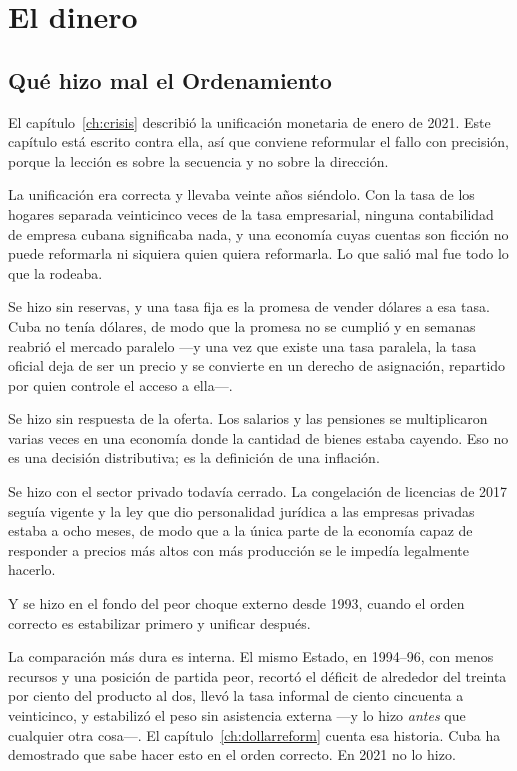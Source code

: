 \chapter{El dinero}
\label{ch:money}

\section{Qué hizo mal el Ordenamiento}

El capítulo~\ref{ch:crisis} describió la unificación monetaria de enero de 2021. Este
capítulo está escrito contra ella, así que conviene reformular el fallo con
precisión, porque la lección es sobre la secuencia y no sobre la dirección.

La unificación era correcta y llevaba veinte años siéndolo. Con la tasa de los hogares
separada veinticinco veces de la tasa empresarial, ninguna contabilidad de empresa
cubana significaba nada, y una economía cuyas cuentas son ficción no puede reformarla
ni siquiera quien quiera reformarla. Lo que salió mal fue todo lo que la rodeaba.

Se hizo sin reservas, y una tasa fija es la promesa de vender dólares a esa tasa. Cuba
no tenía dólares, de modo que la promesa no se cumplió y en semanas reabrió el mercado
paralelo ---y una vez que existe una tasa paralela, la tasa oficial deja de ser un
precio y se convierte en un derecho de asignación, repartido por quien controle el
acceso a ella---.

Se hizo sin respuesta de la oferta. Los salarios y las pensiones se multiplicaron
varias veces en una economía donde la cantidad de bienes estaba cayendo. Eso no es una
decisión distributiva; es la definición de una inflación.

Se hizo con el sector privado todavía cerrado. La congelación de licencias de 2017
seguía vigente y la ley que dio personalidad jurídica a las empresas privadas estaba a
ocho meses, de modo que a la única parte de la economía capaz de responder a precios
más altos con más producción se le impedía legalmente hacerlo.

Y se hizo en el fondo del peor choque externo desde 1993, cuando el orden correcto es
estabilizar primero y unificar después.

La comparación más dura es interna. El mismo Estado, en 1994--96, con menos recursos y
una posición de partida peor, recortó el déficit de alrededor del treinta por ciento
del producto al dos, llevó la tasa informal de ciento cincuenta a veinticinco, y
estabilizó el peso sin asistencia externa ---y lo hizo \emph{antes} que cualquier otra
cosa---. El capítulo~\ref{ch:dollarreform} cuenta esa historia. Cuba ha demostrado que
sabe hacer esto en el orden correcto. En 2021 no lo hizo.

